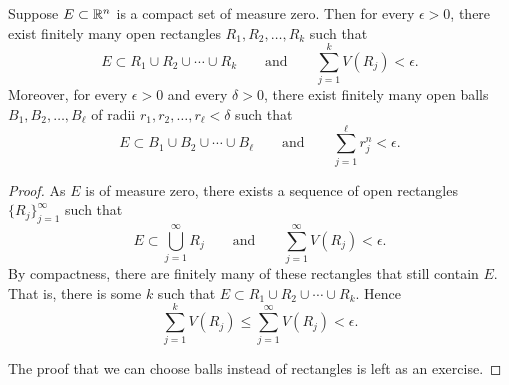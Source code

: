 \begin{prop} \label{mv:prop:compactnull}
Suppose $E \subset {\mathbb{R}}^n$ is a compact set of measure zero.  Then for
every $\epsilon > 0$, there exist
finitely many open rectangles $R_1,R_2,\ldots,R_k$ such that
\begin{equation*}
E \subset R_1 \cup R_2 \cup \cdots \cup R_k
\qquad \text{and} \qquad
\sum_{j=1}^k V(R_j) < \epsilon.
\end{equation*}
Moreover, for every $\epsilon > 0$ and every $\delta > 0$,
there exist finitely many open balls $B_1,B_2,\ldots,B_{\ell}$ of radii
$r_1,r_2,\ldots,r_{\ell} < \delta$ such that
\begin{equation*}
E \subset B_1 \cup B_2 \cup \cdots \cup B_{\ell}
\qquad \text{and} \qquad
\sum_{j=1}^{\ell} r_j^n < \epsilon.
\end{equation*}
\end{prop}

\begin{proof}
As $E$ is of measure zero,
there exists a sequence of open rectangles $\{ R_j \}_{j=1}^\infty$ such that 
\begin{equation*}
E \subset \bigcup_{j=1}^\infty R_j
\qquad \text{and} \qquad
\sum_{j=1}^\infty V(R_j) < \epsilon.
\end{equation*}
By compactness, there are finitely
many of these rectangles that still contain $E$.  That is, there is some $k$ such
that
$E \subset R_1 \cup R_2 \cup \cdots \cup R_k$.  Hence
\begin{equation*}
\sum_{j=1}^k V(R_j) \leq
\sum_{j=1}^\infty V(R_j) < \epsilon.
\end{equation*}

The proof that we can choose balls instead of rectangles is left as an
exercise.
\end{proof}

